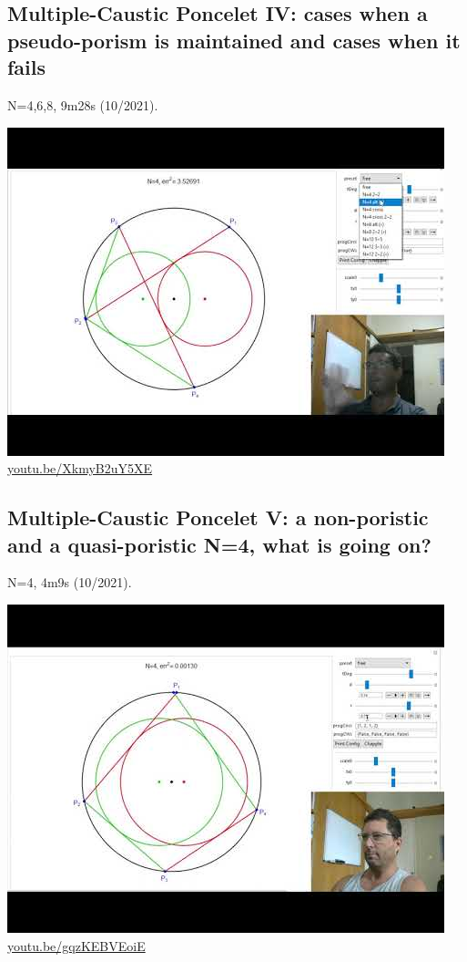 \documentclass[12pt]{amsart}
\begin{document}
\subsection{Multiple-Caustic Poncelet IV: cases when a pseudo-porism is maintained and cases when it fails}
\label{vid:XkmyB2uY5XE}
\noindent N=4,6,8, 9m28s (10/2021). 
\begin{center}\includegraphics[width=.5\textwidth]{pics/XkmyB2uY5XE.jpg} \\ 
\href{https://youtu.be/XkmyB2uY5XE}{\url{youtu.be/XkmyB2uY5XE}}\end{center}
% 

\subsection{Multiple-Caustic Poncelet V: a non-poristic and a quasi-poristic N=4, what is going on?}
\label{vid:gqzKEBVEoiE}
\noindent N=4, 4m9s (10/2021). 
\begin{center}\includegraphics[width=.5\textwidth]{pics/gqzKEBVEoiE.jpg} \\ 
\href{https://youtu.be/gqzKEBVEoiE}{\url{youtu.be/gqzKEBVEoiE}}\end{center}
% 
\end{document}
